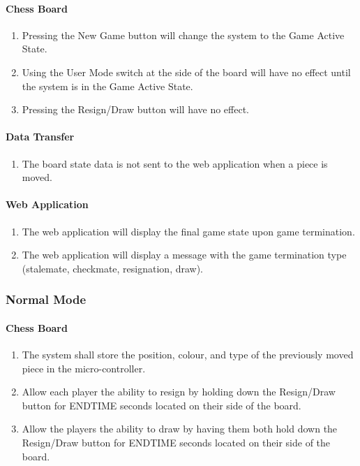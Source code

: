 \documentclass[12pt]{article}
\begin{document}
{\paragraph{Chess Board}
\begin{enumerate}[{GI}1., leftmargin=2\parindent]
    \item Pressing the New Game button will change the system to the Game Active State.
    \item Using the User Mode switch at the side of the board will have no effect until the system is in the Game Active State.
    \item Pressing the Resign/Draw button will have no effect.
\end{enumerate}

\paragraph{Data Transfer}
\begin{enumerate}[{GI}1., leftmargin=2\parindent, resume]
    \item The board state data is not sent to the web application when a piece is moved.
\end{enumerate}

\paragraph{Web Application}
\begin{enumerate}[{GI}1., leftmargin=2\parindent, resume]
    \item The web application will display the final game state upon game termination.
    \item The web application will display a message with the game termination type (stalemate, checkmate, resignation, draw).
\end{enumerate}

\subsubsection{Normal Mode}
\paragraph{Chess Board}
\begin{enumerate}[{NB}1., leftmargin=2\parindent]
    \item The system shall store the position, colour, and type of the previously moved piece in the micro-controller.
    \item Allow each player the ability to resign by holding down the Resign/Draw button for ENDTIME seconds located on their side of the board.
    \item Allow the players the ability to draw by having them both hold down the Resign/Draw button for ENDTIME seconds located on their side of the board. 
\end{enumerate}

}
\end{document}
